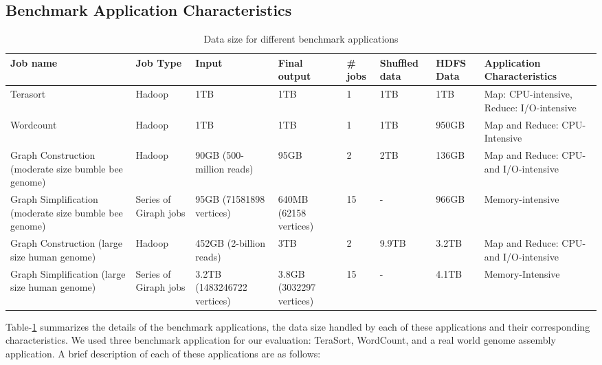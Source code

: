 \documentclass[journal]{IEEEtran}
\begin{document}
\subsection{Benchmark Application Characteristics}
\begin{table}
\caption{Data size for different benchmark applications}
\label{tab:AppChar}
\begin{center}
    \begin{tabular}{ |p{3cm} | p{1.5cm} | p{2.5cm} | p{2.5cm} | p{0.8cm} | p{0.8cm} | p{0.8cm} | p{2.5cm}|} \hline
     Job name & Job Type & Input & Final output & \# jobs & Shuffled data & HDFS Data & Application Characteristics \\ \hline
    Terasort & Hadoop & 1TB & 1TB & 1 & 1TB & 1TB & Map: CPU-intensive, Reduce: I/O-intensive \\ \hline
    Wordcount & Hadoop & 1TB & 1TB & 1 & 1TB & 950GB & Map and Reduce: CPU-Intensive \\ \hline 
   Graph Construction (moderate size bumble bee genome)  & Hadoop & 90GB (500-million reads) & 95GB & 2 & 2TB & 136GB & Map and Reduce: CPU- and I/O-intensive \\ \hline
    Graph Simplification (moderate size bumble bee genome) & Series of Giraph jobs & 95GB (71581898 vertices) & 640MB (62158 vertices) & 15 & - & 966GB & Memory-intensive\\ \hline    
    Graph Construction (large size human genome) & Hadoop & 452GB (2-billion reads) & 3TB & 2 & 9.9TB & 3.2TB &Map and Reduce: CPU- and I/O-intensive\\ \hline
    Graph Simplification (large size human genome) & Series of Giraph jobs & 3.2TB (1483246722 vertices) & 3.8GB (3032297 vertices) & 15 & - & 4.1TB & Memory-Intensive \\ \hline 
    \end{tabular}
\end{center}
\end{table}
Table-\ref{tab:AppChar} summarizes the details of the benchmark applications, the data size handled by each of these applications and their corresponding characteristics. We used three benchmark application for our evaluation: TeraSort, WordCount, and a real world genome assembly application. A brief description of each of these applications are as follows:
\end{document}
